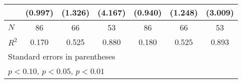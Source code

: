 {\begin{tabular}{l*{6}{c}}
            &     (0.997)         &     (1.326)         &     (4.167)         &     (0.940)         &     (1.248)         &     (3.009)         \\
\hline
\(N\)       &          86         &          66         &          53         &          86         &          66         &          53         \\
\(R^{2}\)   &       0.170         &       0.525         &       0.880         &       0.180         &       0.525         &       0.893         \\
\hline\hline
\multicolumn{7}{l}{\footnotesize Standard errors in parentheses}\\
\multicolumn{7}{l}{\footnotesize \sym{*} \(p<0.10\), \sym{**} \(p<0.05\), \sym{***} \(p<0.01\)}\\
\end{tabular}
}
